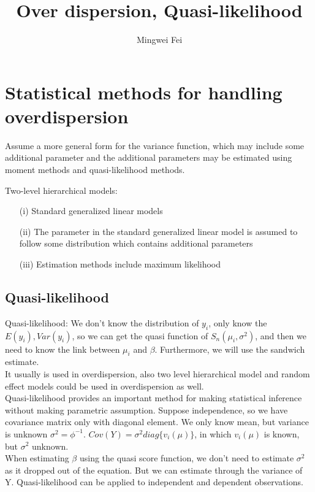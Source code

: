 \documentclass[11pt]{article} %
\title{Over dispersion, Quasi-likelihood}
\author{Mingwei Fei}
\begin{document}
\maketitle

\section{Statistical methods for handling overdispersion}
 
Assume a more general form for the variance function, which may include some additional parameter and the additional parameters may be estimated using moment methods and
quasi-likelihood methods.

Two-level hierarchical models:
\begin{itemize}
	\item [(i)] Standard generalized linear models
	\item [(ii)] The parameter in the standard generalized linear model is assumed to follow some distribution which contains additional parameters
	\item [(iii)] Estimation methods include maximum likelihood
\end{itemize}


\subsection{Quasi-likelihood}


 Quasi-likelihood: We don't know the distribution of $y_i$, only know the $E(y_i), Var(y_i)$, so we can get the quasi function of $S_n(\mu_i, \sigma^2)$, and then we need to know the link between $\mu_i$ and $\beta$. Furthermore, we will use the sandwich estimate.\\
	It usually is used in overdispersion, also two level hierarchical model and random effect models could be used in overdispersion as well.\\
	Quasi-likelihood provides an important method for making statistical inference without making parametric assumption. Suppose independence, so we have covariance matrix only with diagonal element. We only know mean, but variance is unknown $\sigma^2 = \phi^{-1}$. $Cov(Y) =  \sigma^2 diag\{v_i(\mu)\}$, in which $v_i(\mu)$ is known, but $\sigma^2$ unknown.\\
	When estimating $\beta$ using the quasi score function, we don't need to estimate $\sigma^2$ as it dropped out of the equation. But we can estimate through the variance of Y. 
	Quasi-likelihood can be applied to independent and dependent observations.\\
	
\end{document}
